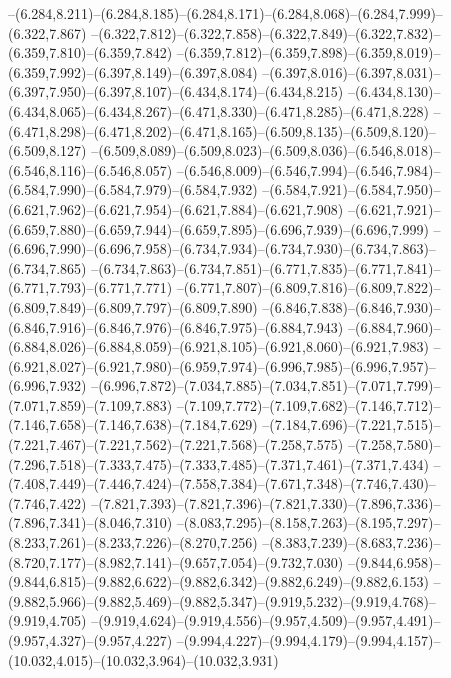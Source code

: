   --(6.284,8.211)--(6.284,8.185)--(6.284,8.171)--(6.284,8.068)--(6.284,7.999)--(6.322,7.867)%
  --(6.322,7.812)--(6.322,7.858)--(6.322,7.849)--(6.322,7.832)--(6.359,7.810)--(6.359,7.842)%
  --(6.359,7.812)--(6.359,7.898)--(6.359,8.019)--(6.359,7.992)--(6.397,8.149)--(6.397,8.084)%
  --(6.397,8.016)--(6.397,8.031)--(6.397,7.950)--(6.397,8.107)--(6.434,8.174)--(6.434,8.215)%
  --(6.434,8.130)--(6.434,8.065)--(6.434,8.267)--(6.471,8.330)--(6.471,8.285)--(6.471,8.228)%
  --(6.471,8.298)--(6.471,8.202)--(6.471,8.165)--(6.509,8.135)--(6.509,8.120)--(6.509,8.127)%
  --(6.509,8.089)--(6.509,8.023)--(6.509,8.036)--(6.546,8.018)--(6.546,8.116)--(6.546,8.057)%
  --(6.546,8.009)--(6.546,7.994)--(6.546,7.984)--(6.584,7.990)--(6.584,7.979)--(6.584,7.932)%
  --(6.584,7.921)--(6.584,7.950)--(6.621,7.962)--(6.621,7.954)--(6.621,7.884)--(6.621,7.908)%
  --(6.621,7.921)--(6.659,7.880)--(6.659,7.944)--(6.659,7.895)--(6.696,7.939)--(6.696,7.999)%
  --(6.696,7.990)--(6.696,7.958)--(6.734,7.934)--(6.734,7.930)--(6.734,7.863)--(6.734,7.865)%
  --(6.734,7.863)--(6.734,7.851)--(6.771,7.835)--(6.771,7.841)--(6.771,7.793)--(6.771,7.771)%
  --(6.771,7.807)--(6.809,7.816)--(6.809,7.822)--(6.809,7.849)--(6.809,7.797)--(6.809,7.890)%
  --(6.846,7.838)--(6.846,7.930)--(6.846,7.916)--(6.846,7.976)--(6.846,7.975)--(6.884,7.943)%
  --(6.884,7.960)--(6.884,8.026)--(6.884,8.059)--(6.921,8.105)--(6.921,8.060)--(6.921,7.983)%
  --(6.921,8.027)--(6.921,7.980)--(6.959,7.974)--(6.996,7.985)--(6.996,7.957)--(6.996,7.932)%
  --(6.996,7.872)--(7.034,7.885)--(7.034,7.851)--(7.071,7.799)--(7.071,7.859)--(7.109,7.883)%
  --(7.109,7.772)--(7.109,7.682)--(7.146,7.712)--(7.146,7.658)--(7.146,7.638)--(7.184,7.629)%
  --(7.184,7.696)--(7.221,7.515)--(7.221,7.467)--(7.221,7.562)--(7.221,7.568)--(7.258,7.575)%
  --(7.258,7.580)--(7.296,7.518)--(7.333,7.475)--(7.333,7.485)--(7.371,7.461)--(7.371,7.434)%
  --(7.408,7.449)--(7.446,7.424)--(7.558,7.384)--(7.671,7.348)--(7.746,7.430)--(7.746,7.422)%
  --(7.821,7.393)--(7.821,7.396)--(7.821,7.330)--(7.896,7.336)--(7.896,7.341)--(8.046,7.310)%
  --(8.083,7.295)--(8.158,7.263)--(8.195,7.297)--(8.233,7.261)--(8.233,7.226)--(8.270,7.256)%
  --(8.383,7.239)--(8.683,7.236)--(8.720,7.177)--(8.982,7.141)--(9.657,7.054)--(9.732,7.030)%
  --(9.844,6.958)--(9.844,6.815)--(9.882,6.622)--(9.882,6.342)--(9.882,6.249)--(9.882,6.153)%
  --(9.882,5.966)--(9.882,5.469)--(9.882,5.347)--(9.919,5.232)--(9.919,4.768)--(9.919,4.705)%
  --(9.919,4.624)--(9.919,4.556)--(9.957,4.509)--(9.957,4.491)--(9.957,4.327)--(9.957,4.227)%
  --(9.994,4.227)--(9.994,4.179)--(9.994,4.157)--(10.032,4.015)--(10.032,3.964)--(10.032,3.931)%
